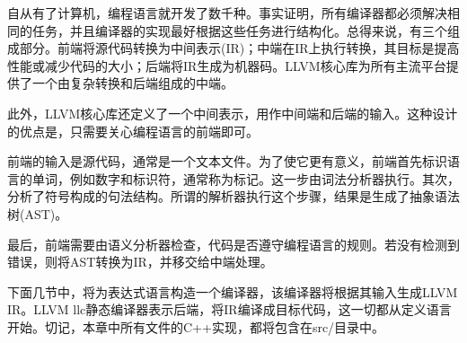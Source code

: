 自从有了计算机，编程语言就开发了数千种。事实证明，所有编译器都必须解决相同的任务，并且编译器的实现最好根据这些任务进行结构化。总得来说，有三个组成部分。前端将源代码转换为中间表示(IR)；中端在IR上执行转换，其目标是提高性能或减少代码的大小；后端将IR生成为机器码。LLVM核心库为所有主流平台提供了一个由复杂转换和后端组成的中端。

此外，LLVM核心库还定义了一个中间表示，用作中间端和后端的输入。这种设计的优点是，只需要关心编程语言的前端即可。

前端的输入是源代码，通常是一个文本文件。为了使它更有意义，前端首先标识语言的单词，例如数字和标识符，通常称为标记。这一步由词法分析器执行。其次，分析了符号构成的句法结构。所谓的解析器执行这个步骤，结果是生成了抽象语法树(AST)。

最后，前端需要由语义分析器检查，代码是否遵守编程语言的规则。若没有检测到错误，则将AST转换为IR，并移交给中端处理。

下面几节中，将为表达式语言构造一个编译器，该编译器将根据其输入生成LLVM IR。LLVM llc静态编译器表示后端，将IR编译成目标代码，这一切都从定义语言开始。切记，本章中所有文件的C++实现，都将包含在src/目录中。